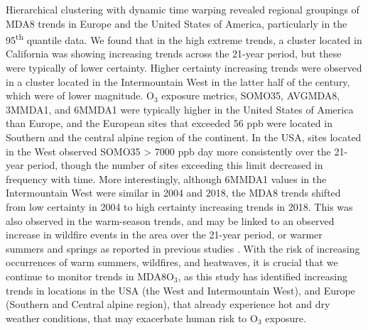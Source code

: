 \documentclass[journal abbreviation, manuscript]{copernicus}
\begin{document}
Hierarchical clustering with dynamic time warping revealed regional groupings of MDA8 trends in Europe and the United States of America, particularly in the 95\textsuperscript{th} quantile data. We found that in the high extreme trends, a cluster located in California was showing increasing trends across the 21-year period, but these were typically of lower certainty. Higher certainty increasing trends were observed in a cluster located in the Intermountain West in the latter half of the century, which were of lower magnitude. O$_3$ exposure metrics, SOMO35, AVGMDA8, 3MMDA1, and 6MMDA1 were typically higher in the United States of America than Europe, and the European sites that exceeded 56 ppb were located in Southern and the central alpine region of the continent. In the USA, sites located in the West observed SOMO35 > 7000 ppb day more consistently over the 21-year period, though the number of sites exceeding this limit decreased in frequency with time. More interestingly, although 6MMDA1 values in the Intermountain West were similar in 2004 and 2018, the MDA8 trends shifted from low certainty in 2004 to high certainty increasing trends in 2018. This was also observed in the warm-season trends, and may be linked to an observed increase in wildfire events in the area over the 21-year period, or warmer summers and springs as reported in previous studies \citep{Lin2017, Li2021, Peterson2021, Iglesias2022}. With the risk of increasing occurrences of warm summers, wildfires, and heatwaves, it is crucial that we continue to monitor trends in MDA8O$_3$, as this study has identified increasing trends in locations in the USA (the West and Intermountain West), and Europe (Southern and Central alpine region), that already experience hot and dry weather conditions, that may exacerbate human risk to O$_3$ exposure.
\end{document}
